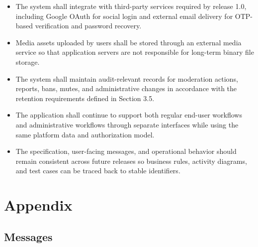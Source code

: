 \documentclass{scrreprt}
\newcounter{appendixmsgcode}
\begin{document}
\begin{itemize}[leftmargin=2cm]
    \item[\textbf{OR-1:}] The system shall integrate with third-party services required by release 1.0, including Google OAuth for social login and external email delivery for OTP-based verification and password recovery.
    \item[\textbf{OR-2:}] Media assets uploaded by users shall be stored through an external media service so that application servers are not responsible for long-term binary file storage.
    \item[\textbf{OR-3:}] The system shall maintain audit-relevant records for moderation actions, reports, bans, mutes, and administrative changes in accordance with the retention requirements defined in Section 3.5.
    \item[\textbf{OR-4:}] The application shall continue to support both regular end-user workflows and administrative workflows through separate interfaces while using the same platform data and authorization model.
    \item[\textbf{OR-5:}] The specification, user-facing messages, and operational behavior should remain consistent across future releases so business rules, activity diagrams, and test cases can be traced back to stable identifiers.
\end{itemize}

\chapter{Appendix}

\section{Messages}

\setcounter{appendixmsgcode}{0}
\end{document}
